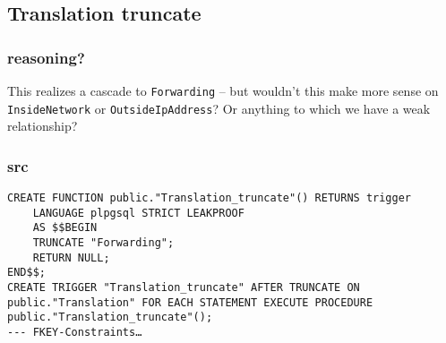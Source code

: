 \documentclass[11pt]{article}
\begin{document}
\subsection{Translation truncate}
\label{sec:orgee768f2}
\subsubsection{reasoning?}
\label{sec:org8cf0e6a}
This realizes a cascade to \texttt{Forwarding} – but wouldn't this make
more sense on \texttt{InsideNetwork} or \texttt{OutsideIpAddress}?  Or anything
to which we have a weak relationship?

\subsubsection{src}
\label{sec:orgfde8ba9}
\begin{verbatim}
CREATE FUNCTION public."Translation_truncate"() RETURNS trigger
    LANGUAGE plpgsql STRICT LEAKPROOF
    AS $$BEGIN
	TRUNCATE "Forwarding";
	RETURN NULL;
END$$;
CREATE TRIGGER "Translation_truncate" AFTER TRUNCATE ON public."Translation" FOR EACH STATEMENT EXECUTE PROCEDURE public."Translation_truncate"();
--- FKEY-Constraints…
\end{verbatim}
\end{document}
